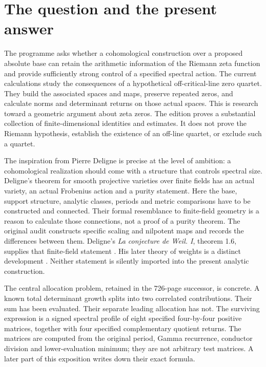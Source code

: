\section{The question and the present answer}\label{the-question-and-the-present-answer}

The programme asks whether a cohomological construction over a proposed absolute base can retain the arithmetic information of the Riemann zeta function and provide sufficiently strong control of a specified spectral action. The current calculations study the consequences of a hypothetical off-critical-line zero quartet. They build the associated spaces and maps, preserve repeated zeros, and calculate norms and determinant returns on those actual spaces. This is research toward a geometric argument about zeta zeros. The edition proves a substantial collection of finite-dimensional identities and estimates. It does not prove the Riemann hypothesis, establish the existence of an off-line quartet, or exclude such a quartet.

The inspiration from Pierre Deligne is precise at the level of ambition: a cohomological realization should come with a structure that controls spectral size. Deligne's theorem for smooth projective varieties over finite fields has an actual variety, an actual Frobenius action and a purity statement. Here the base, support structure, analytic classes, periods and metric comparisons have to be constructed and connected. Their formal resemblance to finite-field geometry is a reason to calculate those connections, not a proof of a purity theorem. The original audit constructs specific scaling and nilpotent maps and records the differences between them. Deligne's \emph{La conjecture de Weil. I}, theorem 1.6, supplies that finite-field statement \cite{Deligne1974WeilI}. His later theory of weights is a distinct development \cite{Deligne1980WeilII}. Neither statement is silently imported into the present analytic construction.

The central allocation problem, retained in the 726-page successor, is concrete. A known total determinant growth splits into two correlated contributions. Their sum has been evaluated. Their separate leading allocation has not. The surviving expression is a signed spectral profile of eight specified four-by-four positive matrices, together with four specified complementary quotient returns. The matrices are computed from the original period, Gamma recurrence, conductor division and lower-evaluation minimum; they are not arbitrary test matrices. A later part of this exposition writes down their exact formula.

